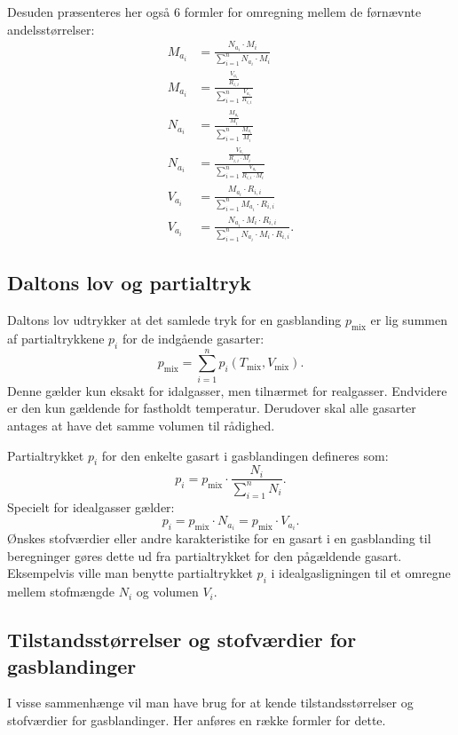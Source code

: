 Desuden præsenteres her også 6 formler for omregning mellem de førnævnte andelsstørrelser:
\begin{align*}
  M_{a_i} &= \frac{N_{a_i} \cdot M_i}{\sum_{i = 1}^{n} N_{a_i} \cdot M_i} \\
  M_{a_i} &= \frac{ \frac{V_{a_i}}{R_{i,i}}}{\sum_{i = 1}^{n} \frac{V_{a_i}}{R_{i,i}}} \\
  N_{a_i} &= \frac{ \frac{M_{a_i}}{M_i}}{\sum_{i = 1}^{n} \frac{M_{a_i}}{M_{i}}} \\
  N_{a_i} &= \frac{ \frac{V_{a_i}}{R_{i,i} \cdot M_i}}{\sum_{i = 1}^{n} \frac{V_{a_i}}{R_{i,i} \cdot M_i}} \\
  V_{a_i} &= \frac{M_{a_i} \cdot R_{i,i}}{\sum_{i = 1}^{n} M_{a_i} \cdot R_{i,i}} \\
  V_{a_i} &= \frac{N_{a_i} \cdot M_i \cdot R_{i,i}}{\sum_{i = 1}^{n} N_{a_i} \cdot M_i \cdot R_{i,i}}
.\end{align*}

\subsection{Daltons lov og partialtryk}
Daltons lov udtrykker at det samlede tryk for en gasblanding $p_{\mathrm{mix}}$ er lig summen af partialtrykkene $p_i$ for de indgående gasarter:
\[ 
p_{\mathrm{mix}} = \sum_{i = 1}^{n} p_i (T_{\mathrm{mix}}, V_{\mathrm{mix}})
.\]
Denne gælder kun eksakt for idalgasser, men tilnærmet for realgasser. Endvidere er den kun gældende for fastholdt temperatur. Derudover skal alle gasarter antages at have det samme volumen til rådighed.

Partialtrykket $p_i$ for den enkelte gasart i gasblandingen defineres som:
\[ 
p_i = p_{\mathrm{mix}} \cdot \frac{N_i}{\sum_{i = 1}^{n} N_i}
.\]
Specielt for idealgasser gælder:
\[ 
p_i = p_{\mathrm{mix}} \cdot N_{a_i} = p_{\mathrm{mix}}\cdot V_{a_i}
.\]
Ønskes stofværdier eller andre karakteristike for en gasart i en gasblanding til beregninger gøres dette ud fra partialtrykket for den pågældende gasart. Eksempelvis ville man benytte partialtrykket $p_i$ i idealgasligningen til et omregne mellem stofmængde $N_i$ og volumen $V_i$. 

\subsection{Tilstandsstørrelser og stofværdier for gasblandinger}
I visse sammenhænge vil man have brug for at kende tilstandsstørrelser og stofværdier for gasblandinger. Her anføres en række formler for dette.

